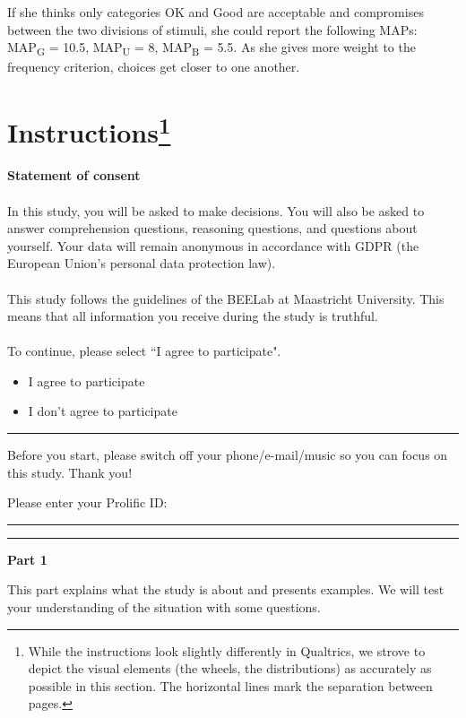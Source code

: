 \documentclass[pdftex,12pt, a4paper]{article}
\begin{document}
If she thinks only categories OK and Good are acceptable and compromises between the two divisions of stimuli, she could report the following MAPs: MAP\textsubscript{G} = 10.5, MAP\textsubscript{U} = 8, MAP\textsubscript{B} = 5.5.
As she gives more weight to the frequency criterion, choices get closer to one another.

\newpage
\section[Instructions]{Instructions\footnote{
While the instructions look slightly differently in Qualtrics, we strove to depict the visual elements (the wheels, the distributions) as accurately as possible in this section.
The horizontal lines mark the separation between pages.
}}
\label{section:appendixc}
\setcounter{figure}{0}
\setcounter{table}{0}
\renewcommand{\thefigure}{C.\arabic{figure}}
\renewcommand{\thetable}{C.\arabic{table}}

\textbf{Statement of consent}\\
\\
\noindent In this study, you will be asked to make decisions.
You will also be asked to answer comprehension questions, reasoning questions, and questions about yourself.
Your data will remain anonymous in accordance with GDPR (the European Union's personal data protection law).\\
\\
\noindent This study follows the guidelines of the BEELab at Maastricht University.
This means that all information you receive during the study is truthful.\\
\\
\noindent To continue, please select ``I agree to participate".
\begin{itemize}
\item I agree to participate
\item I don't agree to participate
\end{itemize}

\bigskip
\noindent \rule{\linewidth}{0.4pt}

\noindent Before you start, please switch off your phone/e-mail/music so you can focus on this study.
Thank you!

\noindent Please enter your Prolific ID: \rule{1cm}{0.15mm}

\bigskip
\noindent \rule{\linewidth}{0.4pt}

\noindent \textbf{Part 1}

\noindent This part explains what the study is about and presents examples.
We will test your understanding of the situation with some questions.
\end{document}

